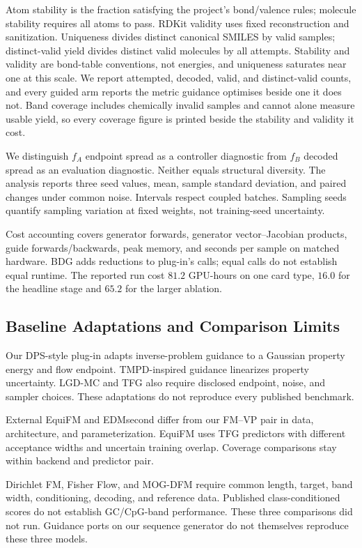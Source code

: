 \documentclass{article}
\begin{document}
Atom stability is the fraction satisfying the project's bond/valence rules; molecule stability requires all atoms to pass. RDKit validity uses fixed reconstruction and sanitization. Uniqueness divides distinct canonical SMILES by valid samples; distinct-valid yield divides distinct valid molecules by all attempts. Stability and validity are bond-table conventions, not energies, and uniqueness saturates near one at this scale. We report attempted, decoded, valid, and distinct-valid counts, and every guided arm reports the metric guidance optimises beside one it does not. Band coverage includes chemically invalid samples and cannot alone measure usable yield, so every coverage figure is printed beside the stability and validity it cost.

We distinguish $f_A$ endpoint spread as a controller diagnostic from $f_B$ decoded spread as an evaluation diagnostic. Neither equals structural diversity. The analysis reports three seed values, mean, sample standard deviation, and paired changes under common noise. Intervals respect coupled batches. Sampling seeds quantify sampling variation at fixed weights, not training-seed uncertainty.

Cost accounting covers generator forwards, generator vector--Jacobian products, guide forwards/backwards, peak memory, and seconds per sample on matched hardware. BDG adds reductions to plug-in's calls; equal calls do not establish equal runtime. The reported run cost $81.2$ GPU-hours on one card type, $16.0$ for the headline stage and $65.2$ for the larger ablation.

\subsection{Baseline Adaptations and Comparison Limits}\label{app:comparisons}
Our DPS-style plug-in adapts inverse-problem guidance to a Gaussian property energy and flow endpoint. TMPD-inspired guidance linearizes property uncertainty. LGD-MC and TFG also require disclosed endpoint, noise, and sampler choices. These adaptations do not reproduce every published benchmark.

External EquiFM and EDMsecond differ from our FM--VP pair in data, architecture, and parameterization. EquiFM uses TFG predictors with different acceptance widths and uncertain training overlap. Coverage comparisons stay within backend and predictor pair.

Dirichlet FM, Fisher Flow, and MOG-DFM require common length, target, band width, conditioning, decoding, and reference data. Published class-conditioned scores do not establish GC/CpG-band performance. These three comparisons did not run. Guidance ports on our sequence generator do not themselves reproduce these three models.
\end{document}
